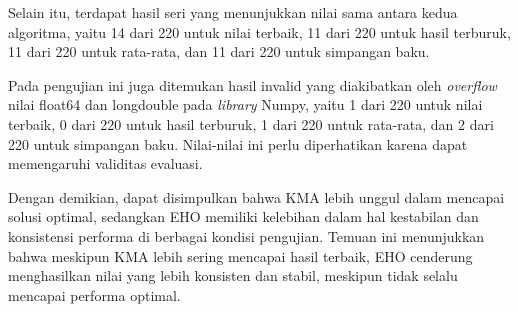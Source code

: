 Selain itu, terdapat hasil seri yang menunjukkan nilai sama antara kedua algoritma, yaitu 14 dari 220 untuk nilai terbaik, 11 dari 220 untuk hasil terburuk, 11 dari 220 untuk rata-rata, dan 11 dari 220 untuk simpangan baku.

Pada pengujian ini juga ditemukan hasil invalid yang diakibatkan oleh \textit{overflow} nilai float64 dan longdouble pada \textit{library} Numpy, yaitu 1 dari 220 untuk nilai terbaik, 0 dari 220 untuk hasil terburuk, 1 dari 220 untuk rata-rata, dan 2 dari 220 untuk simpangan baku. Nilai-nilai ini perlu diperhatikan karena dapat memengaruhi validitas evaluasi.

Dengan demikian, dapat disimpulkan bahwa KMA lebih unggul dalam mencapai solusi optimal, sedangkan EHO memiliki kelebihan dalam hal kestabilan dan konsistensi performa di berbagai kondisi pengujian. Temuan ini menunjukkan bahwa meskipun KMA lebih sering mencapai hasil terbaik, EHO cenderung menghasilkan nilai yang lebih konsisten dan stabil, meskipun tidak selalu mencapai performa optimal.

